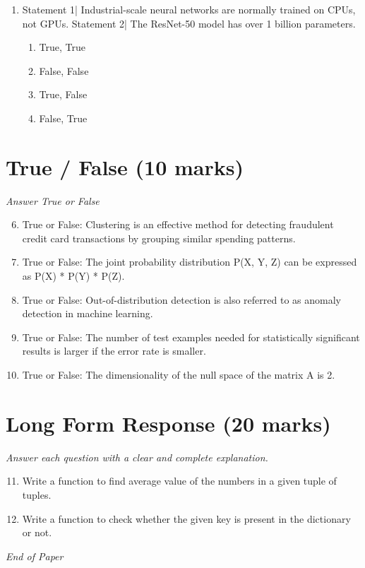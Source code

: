 \documentclass[12pt]{article}
\begin{document}
\begin{enumerate}[label=\arabic*.]
\begin{enumerate}[label=(\alph*)]
    \item It is used for prediction.
    \item It may be used for interpretation.
    \item It discovers causal relationships
\end{enumerate}
\item Statement 1| Industrial-scale neural networks are normally trained on CPUs, not GPUs. Statement 2| The ResNet-50 model has over 1 billion parameters.
\begin{enumerate}[label=(\alph*)]
    \item True, True
    \item False, False
    \item True, False
    \item False, True
\end{enumerate}
\end{enumerate}

\section*{True / False (10 marks)}
\textit{Answer True or False}
\begin{enumerate}[label=\arabic*.]
\setcounter{enumi}{5}
\item True or False: Clustering is an effective method for detecting fraudulent credit card transactions by grouping similar spending patterns.
\item True or False: The joint probability distribution P(X, Y, Z) can be expressed as P(X) * P(Y) * P(Z).
\item True or False: Out-of-distribution detection is also referred to as anomaly detection in machine learning.
\item True or False: The number of test examples needed for statistically significant results is larger if the error rate is smaller.
\item True or False: The dimensionality of the null space of the matrix A is 2.
\end{enumerate}

\section*{Long Form Response (20 marks)}
\textit{Answer each question with a clear and complete explanation.}
\begin{enumerate}[label=\arabic*.]
\setcounter{enumi}{10}
\item Write a function to find average value of the numbers in a given tuple of tuples.
\item Write a function to check whether the given key is present in the dictionary or not.
\end{enumerate}

\vfill
\noindent\textit{End of Paper}
\end{document}
